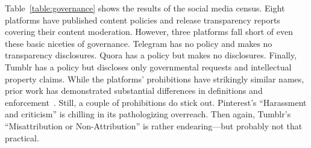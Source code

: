 Table~\ref{table:governance} shows the results of the social media census. Eight
platforms have published content policies and release transparency reports
covering their content moderation. However, three platforms fall short of even
these basic niceties of governance. Telegram has no policy and makes no
transparency disclosures. Quora has a policy but makes no disclosures. Finally,
Tumblr has a policy but discloses only governmental requests and intellectual
property claims. While the platforms' prohibitions have strikingly similar
names, prior work has demonstrated substantial differences in definitions and
enforcement~\cite{FieslerJiangea2018,PaterKimea2016}. Still, a couple of
prohibitions do stick out. Pinterest's ``Harassment and criticism'' is chilling
in its pathologizing overreach. Then again, Tumblr's ``Misattribution or
Non-Attribution'' is rather endearing---but probably not that practical.

